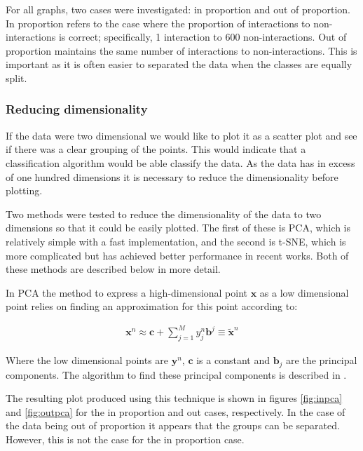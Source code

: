 For all graphs, two cases were investigated: in proportion and out of proportion.
In proportion refers to the case where the proportion of interactions to non-interactions is correct; specifically, 1 interaction to 600 non-interactions.
Out of proportion maintains the same number of interactions to non-interactions.
This is important as it is often easier to separated the data when the classes are equally split.

\subsubsection*{Reducing dimensionality}
If the data were two dimensional we would like to plot it as a scatter plot and see if there was a clear grouping of the points.
This would indicate that a classification algorithm would be able classify the data.
As the data has in excess of one hundred dimensions it is necessary to reduce the dimensionality before plotting.

Two methods were tested to reduce the dimensionality of the data to two dimensions so that it could be easily plotted.
The first of these is PCA, which is relatively simple with a fast implementation, and the second is t-SNE, which is more complicated but has achieved better performance in recent works.
Both of these methods are described below in more detail.

In PCA the method to express a high-dimensional point $\pmb{x}$ as a low dimensional point relies on finding an approximation for this point according to\autocite[330]{barber_bayesian_2013}:

\begin{align}
    \pmb{x}^{n} \approx \pmb{c} + \sum_{j=1}^{M} y_{j}^{n} \pmb{b}^{j} \equiv \tilde{\pmb{x}}^{n}
\end{align}

Where the low dimensional points are $\pmb{y}^{n}$, $\pmb{c}$ is a constant and $\pmb{b}_{j}$ are the principal components.
The algorithm to find these principal components is described in \textcite[333]{barber_bayesian_2013}.

The resulting plot produced using this technique is shown in figures \ref{fig:inpca} and \ref{fig:outpca} for the in proportion and out cases, respectively.
In the case of the data being out of proportion it appears that the groups can be separated.
However, this is not the case for the in proportion case.

